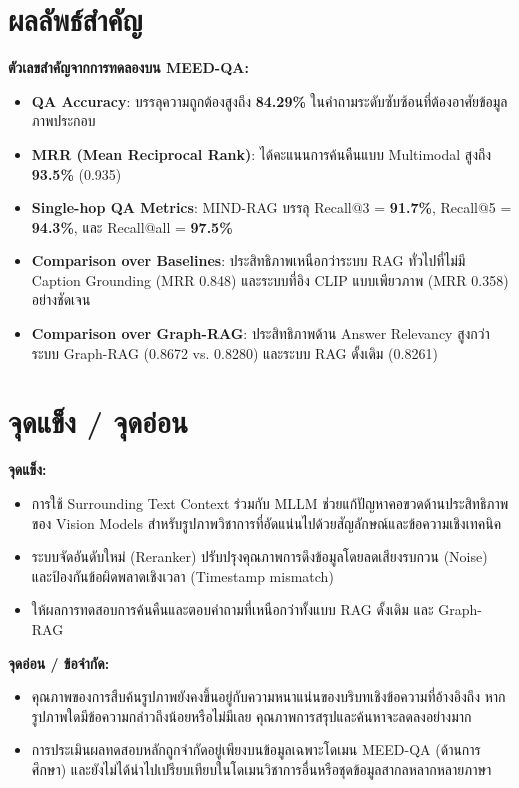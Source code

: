 \documentclass[10pt,a4paper]{article}
\begin{document}
\section*{ผลลัพธ์สำคัญ}

\begin{highlight}
\textbf{ตัวเลขสำคัญจากการทดลองบน MEED-QA:}
\begin{itemize}[nosep]
  \item \textbf{QA Accuracy}: บรรลุความถูกต้องสูงถึง \textbf{84.29\%} ในคำถามระดับซับซ้อนที่ต้องอาศัยข้อมูลภาพประกอบ
  \item \textbf{MRR (Mean Reciprocal Rank)}: ได้คะแนนการค้นคืนแบบ Multimodal สูงถึง \textbf{93.5\%} (0.935)
  \item \textbf{Single-hop QA Metrics}: MIND-RAG บรรลุ Recall@3 = \textbf{91.7\%}, Recall@5 = \textbf{94.3\%}, และ Recall@all = \textbf{97.5\%}
  \item \textbf{Comparison over Baselines}: ประสิทธิภาพเหนือกว่าระบบ RAG ทั่วไปที่ไม่มี Caption Grounding (MRR 0.848) และระบบที่อิง CLIP แบบเพียวภาพ (MRR 0.358) อย่างชัดเจน
  \item \textbf{Comparison over Graph-RAG}: ประสิทธิภาพด้าน Answer Relevancy สูงกว่าระบบ Graph-RAG (0.8672 vs. 0.8280) และระบบ RAG ดั้งเดิม (0.8261)
\end{itemize}
\end{highlight}

\section*{จุดแข็ง / จุดอ่อน}

\noindent\textbf{จุดแข็ง:}
\begin{itemize}[nosep, leftmargin=2em]
  \item การใช้ Surrounding Text Context ร่วมกับ MLLM ช่วยแก้ปัญหาคอขวดด้านประสิทธิภาพของ Vision Models สำหรับรูปภาพวิชาการที่อัดแน่นไปด้วยสัญลักษณ์และข้อความเชิงเทคนิค
  \item ระบบจัดอันดับใหม่ (Reranker) ปรับปรุงคุณภาพการดึงข้อมูลโดยลดเสียงรบกวน (Noise) และป้องกันข้อผิดพลาดเชิงเวลา (Timestamp mismatch)
  \item ให้ผลการทดสอบการค้นคืนและตอบคำถามที่เหนือกว่าทั้งแบบ RAG ดั้งเดิม และ Graph-RAG
\end{itemize}

\vspace{6pt}
\noindent\textbf{จุดอ่อน / ข้อจำกัด:}
\begin{itemize}[nosep, leftmargin=2em]
  \item คุณภาพของการสืบค้นรูปภาพยังคงขึ้นอยู่กับความหนาแน่นของบริบทเชิงข้อความที่อ้างอิงถึง หากรูปภาพใดมีข้อความกล่าวถึงน้อยหรือไม่มีเลย คุณภาพการสรุปและค้นหาจะลดลงอย่างมาก
  \item การประเมินผลทดสอบหลักถูกจำกัดอยู่เพียงบนข้อมูลเฉพาะโดเมน MEED-QA (ด้านการศึกษา) และยังไม่ได้นำไปเปรียบเทียบในโดเมนวิชาการอื่นหรือชุดข้อมูลสากลหลากหลายภาษา
\end{itemize}
\end{document}
